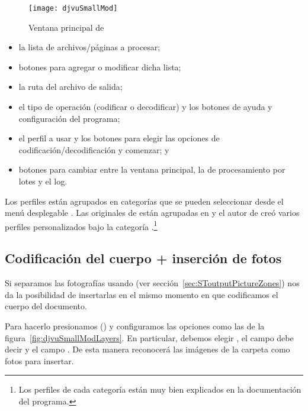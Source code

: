 \documentclass[%
	a5paper,
	10pt,
	twoside,
	openright,
	final,
]{memoir}
\begin{document}
	\begin{figure}
		\texttt{[image: djvuSmallMod]}
		\caption{Ventana principal de \djvusmallmod\label{fig:djvuSmallMod}}
	\end{figure}

	\begin{itemize}[noitemsep]
		\item la lista de archivos/páginas a procesar;
		\item botones para agregar o modificar dicha lista;
		\item la ruta del archivo de salida;
		\item el tipo de operación (codificar o decodificar) y los botones de ayuda y configuración del programa;
		\item el perfil a usar y los botones para elegir las opciones de codificación/decodificación y comenzar; y
		\item botones para cambiar entre la ventana principal, la de procesamiento por lotes y el log.
	\end{itemize}

	Los perfiles están agrupados en categorías que se pueden seleccionar desde el menú desplegable . Las originales de \dexpress están agrupadas en  y el autor de \djvusmallmod creó varios perfiles personalizados bajo la categoría .\footnote{Los perfiles de cada categoría están muy bien explicados en la documentación del programa.}

	\subsection{Codificación del cuerpo + inserción de fotos\label{sec:djvuSmallModPhotos}} Si separamos las fotografías usando \scantailor (ver sección~\ref{sec:SToutputPictureZones}) \djvusmallmod nos da la posibilidad de insertarlas en el mismo momento en que codificamos el cuerpo del documento.

	Para hacerlo presionamos \keys{\faFilter} () y configuramos las opciones como las de la figura~\ref{fig:djvuSmallModLayers}. En particular, debemos elegir , el campo  debe decir  y el campo  . De esta manera reconocerá las imágenes de la carpeta  como fotos para insertar.
\end{document}

